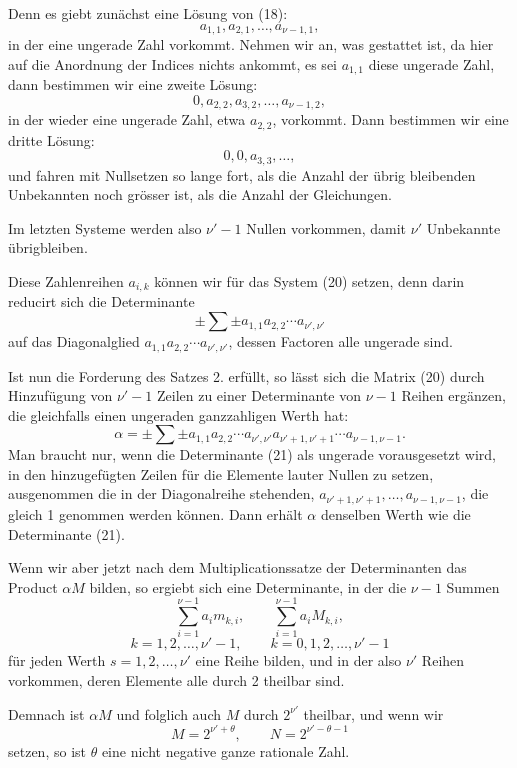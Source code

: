 \documentclass[11pt]{article}
\begin{document}
Denn es giebt zunächst eine Lösung von (18):
\[
a_{1,1},a_{2,1},\ldots,a_{\nu-1,1},
\]
in der eine ungerade Zahl vorkommt. Nehmen wir an, was gestattet ist, da hier auf die Anordnung der Indices nichts ankommt,
es sei $a_{1,1}$ diese ungerade Zahl, dann bestimmen wir eine zweite Lösung:
\[
0,a_{2,2},a_{3,2},\ldots,a_{\nu-1,2},
\]
in der wieder eine ungerade Zahl, etwa $a_{2,2}$, vorkommt. Dann bestimmen wir eine dritte Lösung:
\[
0,0,a_{3,3},\ldots,
\]
und fahren mit Nullsetzen so lange fort, als die Anzahl der übrig bleibenden Unbekannten noch grösser ist, als die Anzahl der Gleichungen.

Im letzten Systeme werden also $\nu'-1$ Nullen vorkommen, damit $\nu'$ Unbekannte übrigbleiben.

Diese Zahlenreihen $a_{i,k}$ können wir für das System (20) setzen, denn darin reducirt sich die Determinante
\begin{equation}
\pm\sum\pm a_{1,1}a_{2,2}\cdots a_{\nu',\nu'}
\tag{21}
\end{equation}
auf das Diagonalglied $a_{1,1}a_{2,2}\cdots a_{\nu',\nu'}$, dessen Factoren alle ungerade sind.

Ist nun die Forderung des Satzes 2. erfüllt, so lässt sich die Matrix (20) durch Hinzufügung von $\nu'-1$ Zeilen zu einer Determinante von $\nu-1$ Reihen ergänzen, die gleichfalls einen ungeraden ganzzahligen Werth hat:
\begin{equation}
\alpha=\pm\sum\pm a_{1,1}a_{2,2}\cdots a_{\nu',\nu'}a_{\nu'+1,\nu'+1}\cdots a_{\nu-1,\nu-1}.
\tag{22}
\end{equation}
Man braucht nur, wenn die Determinante (21) als ungerade vorausgesetzt wird, in den hinzugefügten Zeilen für die Elemente lauter Nullen zu setzen, ausgenommen die in der Diagonalreihe stehenden, $a_{\nu'+1,\nu'+1},\ldots,a_{\nu-1,\nu-1}$, die gleich 1 genommen werden können. Dann erhält $\alpha$ denselben Werth wie die Determinante (21).

Wenn wir aber jetzt nach dem Multiplicationssatze der Determinanten das Product $\alpha M$ bilden, so ergiebt sich eine Determinante, in der die $\nu-1$ Summen
\[
\sum_{i=1}^{\nu-1}a_i m_{k,i},
\qquad
\sum_{i=1}^{\nu-1}a_i M_{k,i},
\]
\[
k=1,2,\ldots,\nu'-1,
\qquad
k=0,1,2,\ldots,\nu'-1
\]
für jeden Werth $s=1,2,\ldots,\nu'$ eine Reihe bilden, und in der also $\nu'$ Reihen vorkommen, deren Elemente alle durch 2 theilbar sind.

Demnach ist $\alpha M$ und folglich auch $M$ durch $2^{\nu'}$ theilbar, und wenn wir
\begin{equation}
M=2^{\nu'+\theta},\qquad N=2^{\nu'-\theta-1}
\tag{23}
\end{equation}
setzen, so ist $\theta$ eine nicht negative ganze rationale Zahl.
\end{document}
